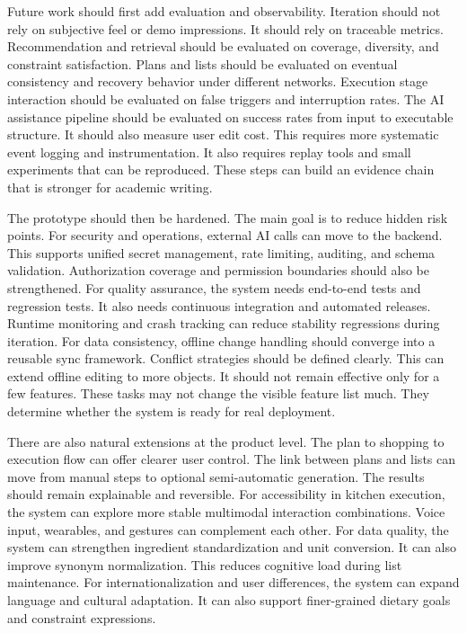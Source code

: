 \documentclass[journal]{IEEEtran}
\begin{document}
Future work should first add evaluation and observability. Iteration should not rely on subjective feel or demo impressions. It should rely on traceable metrics. Recommendation and retrieval should be evaluated on coverage, diversity, and constraint satisfaction. Plans and lists should be evaluated on eventual consistency and recovery behavior under different networks. Execution stage interaction should be evaluated on false triggers and interruption rates. The AI assistance pipeline should be evaluated on success rates from input to executable structure. It should also measure user edit cost. This requires more systematic event logging and instrumentation. It also requires replay tools and small experiments that can be reproduced. These steps can build an evidence chain that is stronger for academic writing.

The prototype should then be hardened. The main goal is to reduce hidden risk points. For security and operations, external AI calls can move to the backend. This supports unified secret management, rate limiting, auditing, and schema validation. Authorization coverage and permission boundaries should also be strengthened. For quality assurance, the system needs end-to-end tests and regression tests. It also needs continuous integration and automated releases. Runtime monitoring and crash tracking can reduce stability regressions during iteration. For data consistency, offline change handling should converge into a reusable sync framework. Conflict strategies should be defined clearly. This can extend offline editing to more objects. It should not remain effective only for a few features. These tasks may not change the visible feature list much. They determine whether the system is ready for real deployment.

There are also natural extensions at the product level. The plan to shopping to execution flow can offer clearer user control. The link between plans and lists can move from manual steps to optional semi-automatic generation. The results should remain explainable and reversible. For accessibility in kitchen execution, the system can explore more stable multimodal interaction combinations. Voice input, wearables, and gestures can complement each other. For data quality, the system can strengthen ingredient standardization and unit conversion. It can also improve synonym normalization. This reduces cognitive load during list maintenance. For internationalization and user differences, the system can expand language and cultural adaptation. It can also support finer-grained dietary goals and constraint expressions.



\end{document}

